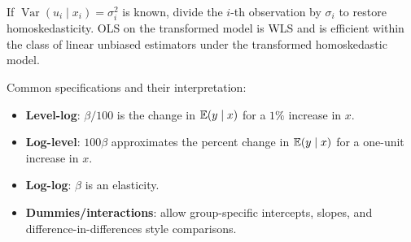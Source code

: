 \begin{remark}
	If $\operatorname{Var}(u_i \mid x_i) = \sigma_i^2$ is known, divide the $i$-th observation by $\sigma_i$ to restore homoskedasticity. OLS on the transformed model is WLS and is efficient within the class of linear unbiased estimators under the transformed homoskedastic model.
\end{remark}

\begin{remark}
	Common specifications and their interpretation:
	\begin{itemize}
		\item \textbf{Level-log}: $\beta/100$ is the change in $\mathbb{E}(y \mid x)$ for a $1\%$ increase in $x$.
		\item \textbf{Log-level}: $100\beta$ approximates the percent change in $\mathbb{E}(y \mid x)$ for a one-unit increase in $x$.
		\item \textbf{Log-log}: $\beta$ is an elasticity.
		\item \textbf{Dummies/interactions}: allow group-specific intercepts, slopes, and difference-in-differences style comparisons.
	\end{itemize}
\end{remark}
